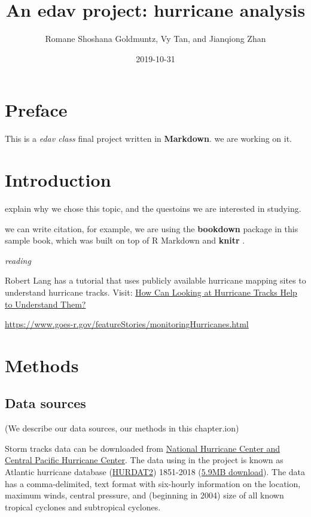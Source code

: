 \documentclass[]{book}
\title{An edav project: hurricane analysis}
\author{Romane Shoshana Goldmuntz, Vy Tan, and Jianqiong Zhan}
\date{2019-10-31}
\begin{document}
\maketitle

{
\setcounter{tocdepth}{1}
\tableofcontents
}
\hypertarget{preface}{%
\chapter{Preface}\label{preface}}

This is a \emph{edav class} final project written in \textbf{Markdown}. we are working on it.

\hypertarget{intro}{%
\chapter{Introduction}\label{intro}}

explain why we chose this topic, and the questoins we are interested in studying.

we can write citation, for example, we are using the \textbf{bookdown} package \citep{R-bookdown} in this sample book, which was built on top of R Markdown and \textbf{knitr} \citep{xie2015}.

\emph{reading}

Robert Lang has a tutorial that uses publicly available hurricane mapping sites to understand hurricane tracks. Visit: \href{\%22https://www.gislounge.com/how-can-looking-at-hurricane-tracks-help-to-understand-them/\%22}{How Can Looking at Hurricane Tracks Help to Understand Them?}

\url{https://www.goes-r.gov/featureStories/monitoringHurricanes.html}

\hypertarget{methods}{%
\chapter{Methods}\label{methods}}

\hypertarget{data-sources}{%
\section{Data sources}\label{data-sources}}

(We describe our data sources, our methods in this chapter.ion)

Storm tracks data can be downloaded from \href{\%22https://www.nhc.noaa.gov/data/\#hurdat\%22}{National Hurricane Center and Central Pacific Hurricane Center}. The data using in the project is known as Atlantic hurricane database (\href{\%22https://www.nhc.noaa.gov/data/hurdat/hurdat2-format-atlantic.pdf\%22}{HURDAT2}) 1851-2018 (\href{\%22https://www.nhc.noaa.gov/data/hurdat/hurdat2-1851-2018-051019.txt\%22}{5.9MB download}). The data has a comma-delimited, text format with six-hourly information on the location, maximum winds, central pressure, and (beginning in 2004) size of all known tropical cyclones and subtropical cyclones.
\end{document}
